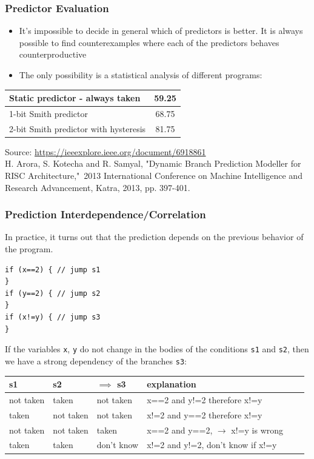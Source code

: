 \documentclass{beamer}
\begin{document}
\begin{frame}
\frametitle{Predictor Evaluation}

\begin{itemize}
\item It's impossible to decide in general which of predictors is better. It is always possible to find counterexamples where each of the predictors behaves counterproductive
\item The only possibility is a statistical analysis of different programs:
\end{itemize}
\begin{center}
\begin{tabular}{|l|c|} \hline
Static predictor - always taken & 59.25 \\\hline
1-bit Smith predictor & 68.75 \\\hline
2-bit Smith predictor with hysteresis & 81.75 \\\hline
\end{tabular}
\end{center}

Source: \url{https://ieeexplore.ieee.org/document/6918861}\\
H. Arora, S. Kotecha and R. Samyal, "Dynamic Branch Prediction Modeller for RISC Architecture," 2013 International Conference on Machine Intelligence and Research Advancement, Katra, 2013, pp. 397-401.
\end{frame}

\begin{frame}[fragile]
\frametitle{Prediction Interdependence/Correlation}

In practice, it turns out that the prediction depends on the previous behavior of the program.

\begin{verbatim}
if (x==2) { // jump s1
}
if (y==2) { // jump s2
}
if (x!=y) { // jump s3
}
\end{verbatim}

If the variables \texttt{x}, \texttt{y} do not change in the bodies of the conditions \texttt{s1} and \texttt{s2}, then we have a strong dependency of the branches \texttt{s3}:

\bigskip

\begin{tabular}{|l|l|l|l|l|l|}\hline
s1 & s2 & $\implies$ s3 & explanation \\\hline
not taken & taken & not taken & x==2 and y!=2 therefore x!=y \\\hline
taken & not taken & not taken & x!=2 and y==2 therefore x!=y \\\hline
not taken & not taken & taken & x==2 and y==2, $\rightarrow$ x!=y is wrong\\\hline
taken & taken & don't know & x!=2 and y!=2, don't know if x!=y \\\hline
\end{tabular}
\end{frame}
\end{document}
